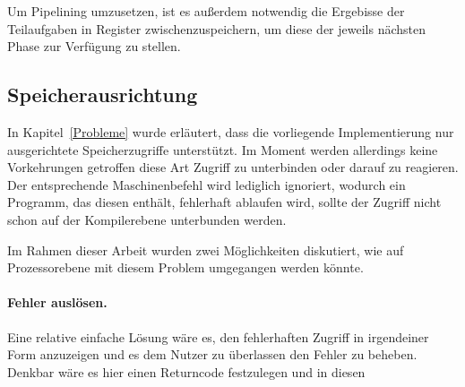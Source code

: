 Um Pipelining umzusetzen, ist es außerdem notwendig die Ergebisse der Teilaufgaben in Register zwischenzuspeichern, um diese der jeweils nächsten Phase zur Verfügung zu stellen.







\subsection{Speicherausrichtung}
In Kapitel~\ref{Probleme} wurde erläutert, dass die vorliegende Implementierung nur ausgerichtete Speicherzugriffe unterstützt.
Im Moment werden allerdings keine Vorkehrungen getroffen diese Art Zugriff zu unterbinden oder darauf zu reagieren.
Der entsprechende Maschinenbefehl wird lediglich ignoriert, wodurch ein Programm, das diesen enthält, fehlerhaft ablaufen wird, sollte der Zugriff nicht schon auf der Kompilerebene unterbunden werden.

Im Rahmen dieser Arbeit wurden zwei Möglichkeiten diskutiert, wie auf Prozessorebene mit diesem Problem umgegangen werden könnte.

\paragraph{Fehler auslösen.}
Eine relative einfache Lösung wäre es, den fehlerhaften Zugriff in irgendeiner Form anzuzeigen und es dem Nutzer zu überlassen den Fehler zu beheben.
Denkbar wäre es hier einen Returncode festzulegen und in diesen 




\iffalse
- den Zugriff auflösen zu Byte-Zugriff -> sehr langsam
- mit compiler von vornherein unterbinden
- return code
\fi


